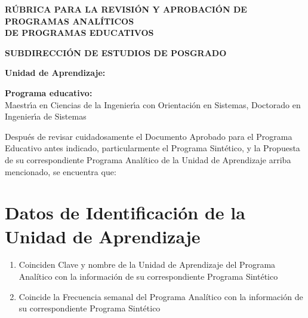 \documentclass{article}
\begin{document}
\pagestyle{fancy}

\begin{center}
  {\bf R\'{U}BRICA PARA LA REVISI\'{O}N Y APROBACI\'{O}N DE PROGRAMAS ANAL\'{I}TICOS \\ DE PROGRAMAS EDUCATIVOS}

  {\bf SUBDIRECCI\'{O}N DE ESTUDIOS DE POSGRADO}
\end{center}

\begin{Form}

  {\bf Unidad de Aprendizaje:} \\
  \TextField[name=ua,multiline=false,bordercolor=black,align=0,width=\textwidth,height=7mm,default={Clave y nombre}]{}

{\bf Programa educativo:} \\
  \ChoiceMenu[print,combo,default=Seleccione,name=pr,width=\textwidth]{}%
           {Maestr\'{\i}a en Ciencias de la Ingenier\'{\i}a con Orientaci\'{o}n en Sistemas, %
             Doctorado en Ingenier\'{\i}a de Sistemas}

Despu\'{e}s de revisar cuidadosamente el Documento Aprobado para el
Programa Educativo antes indicado, particularmente el Programa
Sint\'{e}tico, y la Propuesta de su correspondiente Programa Anal\'{i}tico de
la Unidad de Aprendizaje arriba mencionado, se encuentra que:

\section{Datos de Identificaci\'{o}n de la Unidad de Aprendizaje}


\begin{enumerate}[leftmargin=*,itemsep=-2pt]

\item{Coinciden Clave y nombre de la Unidad de Aprendizaje del
  Programa Anal\'{i}tico con la informaci\'{o}n de su correspondiente
  Programa Sint\'{e}tico  \hfill {}
  \quad
  }

\item{Coincide la Frecuencia semanal del Programa Anal\'{i}tico con la
  informaci\'{o}n de su correspondiente Programa Sint\'{e}tico \begin{flushright}
  \quad
\end{flushright}
}


\end{enumerate}
\end{Form}
\end{document}

